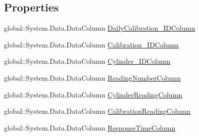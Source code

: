 \subsection*{Properties}
\begin{DoxyCompactItemize}
\item 
global\+::\+System.\+Data.\+Data\+Column \hyperlink{class_env_int_1_1_win32_1_1_field_tech_1_1_manager_1_1_data_sets_1_1_guide_ware_mobile_data_set_5b380d875f3f569d74f6183f0c2ee8d7_a47a838d40757541d36a38989a6e2d838}{Daily\+Calibration\+\_\+\+I\+D\+Column}
\item 
global\+::\+System.\+Data.\+Data\+Column \hyperlink{class_env_int_1_1_win32_1_1_field_tech_1_1_manager_1_1_data_sets_1_1_guide_ware_mobile_data_set_5b380d875f3f569d74f6183f0c2ee8d7_a49f04a396ca25e11f7beff9969ee17ec}{Calibration\+\_\+\+I\+D\+Column}
\item 
global\+::\+System.\+Data.\+Data\+Column \hyperlink{class_env_int_1_1_win32_1_1_field_tech_1_1_manager_1_1_data_sets_1_1_guide_ware_mobile_data_set_5b380d875f3f569d74f6183f0c2ee8d7_abd0a7306dd5dffdf3deb1a04a5c31ab5}{Cylinder\+\_\+\+I\+D\+Column}
\item 
global\+::\+System.\+Data.\+Data\+Column \hyperlink{class_env_int_1_1_win32_1_1_field_tech_1_1_manager_1_1_data_sets_1_1_guide_ware_mobile_data_set_5b380d875f3f569d74f6183f0c2ee8d7_a375da3c28a4d0b5c0128026cd88e02d1}{Reading\+Number\+Column}
\item 
global\+::\+System.\+Data.\+Data\+Column \hyperlink{class_env_int_1_1_win32_1_1_field_tech_1_1_manager_1_1_data_sets_1_1_guide_ware_mobile_data_set_5b380d875f3f569d74f6183f0c2ee8d7_a9fea039144ac86be64ac060fe87ee972}{Cylinder\+Reading\+Column}
\item 
global\+::\+System.\+Data.\+Data\+Column \hyperlink{class_env_int_1_1_win32_1_1_field_tech_1_1_manager_1_1_data_sets_1_1_guide_ware_mobile_data_set_5b380d875f3f569d74f6183f0c2ee8d7_ace7e1d4c58db87646a629fa92225c676}{Calibration\+Reading\+Column}
\item 
global\+::\+System.\+Data.\+Data\+Column \hyperlink{class_env_int_1_1_win32_1_1_field_tech_1_1_manager_1_1_data_sets_1_1_guide_ware_mobile_data_set_5b380d875f3f569d74f6183f0c2ee8d7_a4ab1941e50c006e7530c45c61a9c5d5b}{Response\+Time\+Column}

\end{DoxyCompactItemize}
